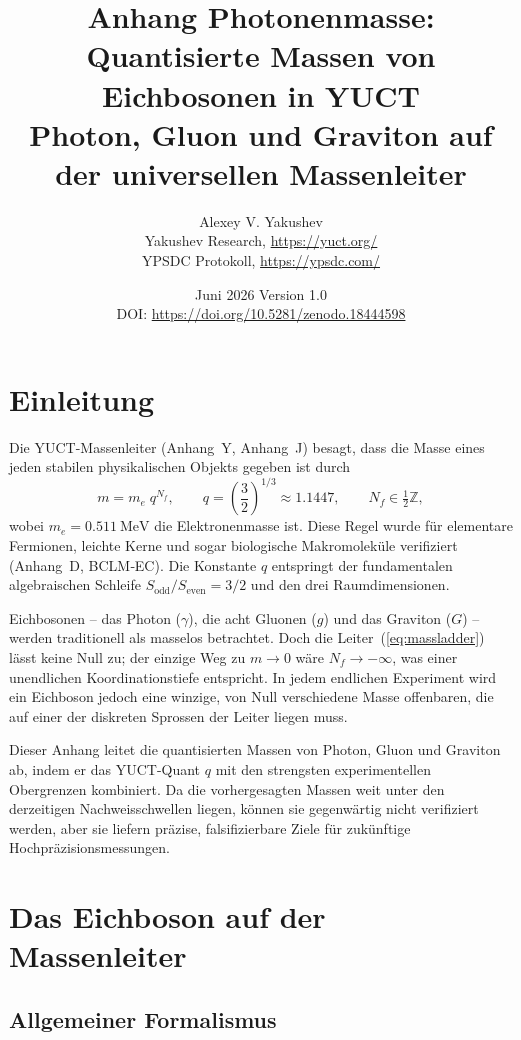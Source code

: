 \documentclass[12pt,a4paper]{article}
\title{\Huge\textbf{Anhang Photonenmasse: Quantisierte Massen von Eichbosonen in YUCT}\\[0.3cm]
	\Large Photon, Gluon und Graviton auf der universellen Massenleiter}
\author{Alexey V. Yakushev \\ 
	Yakushev Research, \url{https://yuct.org/} \\ 
	YPSDC Protokoll, \url{https://ypsdc.com/}}
\date{Juni 2026 \quad Version 1.0 \\ \medskip
	DOI: \url{https://doi.org/10.5281/zenodo.18444598}}
\begin{document}
	
	\maketitle
	\newpage
	\tableofcontents
	\newpage
	
	\section{Einleitung}
	
	Die YUCT-Massenleiter (Anhang~Y, Anhang~J) besagt, dass die Masse eines jeden stabilen physikalischen Objekts gegeben ist durch
	\begin{equation}\label{eq:massladder}
		m = m_e \; q^{N_f}, \qquad q = \left(\frac{3}{2}\right)^{\!1/3} \approx 1.1447,
		\qquad N_f \in \tfrac12\mathbb{Z},
	\end{equation}
	wobei $m_e = 0.511~\mathrm{MeV}$ die Elektronenmasse ist. Diese Regel wurde für elementare Fermionen,
	leichte Kerne und sogar biologische Makromoleküle verifiziert (Anhang~D, BCLM‑EC). Die Konstante $q$ entspringt
	der fundamentalen algebraischen Schleife $S_{\mathrm{odd}}/S_{\mathrm{even}} = 3/2$ und den drei Raumdimensionen.
	
	Eichbosonen – das Photon ($\gamma$), die acht Gluonen ($g$) und das Graviton ($G$) – werden traditionell
	als masselos betrachtet. Doch die Leiter~(\ref{eq:massladder}) lässt keine Null zu; der einzige Weg zu
	$m \to 0$ wäre $N_f \to -\infty$, was einer unendlichen Koordinationstiefe entspricht. In jedem endlichen
	Experiment wird ein Eichboson jedoch eine winzige, von Null verschiedene Masse offenbaren, die auf einer
	der diskreten Sprossen der Leiter liegen muss.
	
	Dieser Anhang leitet die quantisierten Massen von Photon, Gluon und Graviton ab, indem er das YUCT-Quant $q$
	mit den strengsten experimentellen Obergrenzen kombiniert. Da die vorhergesagten Massen weit unter den
	derzeitigen Nachweisschwellen liegen, können sie gegenwärtig nicht verifiziert werden, aber sie liefern
	präzise, falsifizierbare Ziele für zukünftige Hochpräzisionsmessungen.
	
	\section{Das Eichboson auf der Massenleiter}
	
	\subsection{Allgemeiner Formalismus}
	
\end{document}
